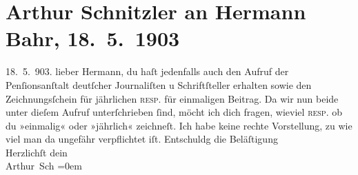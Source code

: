 

         
         \renewcommand{\erwaehntePersonen}{Personen: Hermann Bahr}
         \renewcommand{\erwaehnteInstitutionen}{Institutionen: Pensionsanstalt deutscher Journalisten und Schriftsteller}
         \renewcommand{\erwaehnteOrte}{Orte: Wien}
         \renewcommand{\erwaehnteWerke}{}
               \section[Arthur Schnitzler an Hermann Bahr, 18. 5. 1903]{ Arthur Schnitzler an Hermann Bahr, 18. 5. 1903}\nopagebreak{}\rehead{ }\begin{ledgroupsized}[t]{13cm}\normalsize\beginnumbering \toendnotes[C]{\smallbreak\pagebreak[2]} 
\pstart
           \raggedleft{}{\pb}18. 5. 903.\pend
           \pstart{}lieber Hermann,\pend\pstart
           du haſt jedenfalls auch den Aufruf der Penſionsanſtalt
                  deutſcher Journaliſten u Schriftſteller erhalten sowie den Zeichnungsſchein
               für jährlichen \textsc{resp.} für einmaligen Beitrag. Da wir nun
               beide unter {\pb}dieſem
               Aufruf unterſchrieben ſind, möcht ich dich fragen, wieviel \textsc{resp.} ob du »einmalig« oder »jährlich« zeichneſt. Ich habe keine rechte
               Vorstellung, zu wie viel man da ungefähr verpflichtet iſt.\pend
           \pstart
           Entschuldg die Beläſtigung{\\[\baselineskip]}Herzlichſt dein{\\[\baselineskip]}\spacefill\mbox{Arthur Sch}\pend
           \leftskip=0em{}
         
         \endnumbering{}\end{ledgroupsized}  \newcommand{\dateiname}{L01290}\newcommand{\titel}{Arthur Schnitzler an Hermann Bahr, 18. 5. 1903}\newcommand{\editorInnen}{ Kurt Ifkovits,  Martin Anton Müller}
      